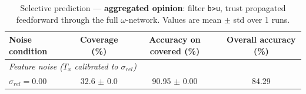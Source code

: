 \begin{table}[ht]
\centering
\caption{Selective prediction — \textbf{aggregated opinion}: filter \texttt{b>u}, trust propagated feedforward through the full $\omega$-network. Values are mean $\pm$ std over 1 runs.}
\label{tab:thresh-aggr-0-8}
\begin{tabular}{lccc}
\toprule
Noise condition & Coverage (\%) & Accuracy on covered (\%) & Overall accuracy (\%) \\
\midrule
\multicolumn{4}{l}{\textit{Feature noise ($T_x$ calibrated to $\sigma_{rel}$)}} \\
$\sigma_{rel}=0.00$ & 32.6 $\pm$ 0.0 & 90.95 $\pm$ 0.00 & 84.29 \\
\bottomrule
\end{tabular}
\end{table}